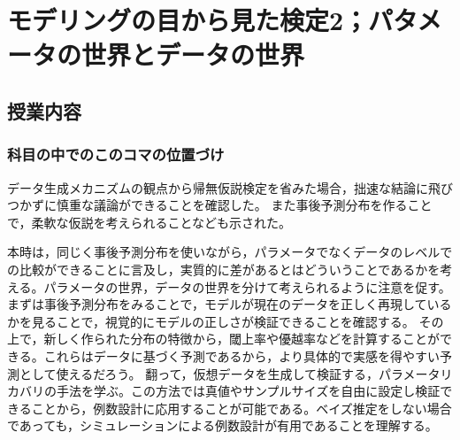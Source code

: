 \section{モデリングの目から見た検定2；パタメータの世界とデータの世界}
\subsection{授業内容}
\subsubsection{科目の中でのこのコマの位置づけ}
データ生成メカニズムの観点から帰無仮説検定を省みた場合，拙速な結論に飛びつかずに慎重な議論ができることを確認した。
また事後予測分布を作ることで，柔軟な仮説を考えられることなども示された。

本時は，同じく事後予測分布を使いながら，パラメータでなくデータのレベルでの比較ができることに言及し，実質的に差があるとはどういうことであるかを考える。パラメータの世界，データの世界を分けて考えられるように注意を促す。
まずは事後予測分布をみることで，モデルが現在のデータを正しく再現しているかを見ることで，視覚的にモデルの正しさが検証できることを確認する。
その上で，新しく作られた分布の特徴から，閾上率や優越率などを計算することができる。これらはデータに基づく予測であるから，より具体的で実感を得やすい予測として使えるだろう。
翻って，仮想データを生成して検証する，パラメータリカバリの手法を学ぶ。この方法では真値やサンプルサイズを自由に設定し検証できることから，例数設計に応用することが可能である。ベイズ推定をしない場合であっても，シミュレーションによる例数設計が有用であることを理解する。

